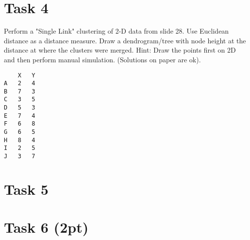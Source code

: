 \documentclass{article}
\begin{document}
\section*{Task 4}
Perform a "Single Link" clustering of 2-D data from slide 28. Use Euclidean distance as a distance measure. Draw a dendrogram/tree with node height at the distance at where the clusters were merged. Hint: Draw the points first on 2D and then perform manual simulation. (Solutions on paper are ok).
\begin{lstlisting}
	X	Y
A	2	4
B	7	3
C	3	5
D	5	3
E	7	4
F	6	8
G	6	5
H	8	4
I	2	5
J	3	7
\end{lstlisting}

\section*{Task 5}

\section*{Task 6 (2pt)}
\end{document}

